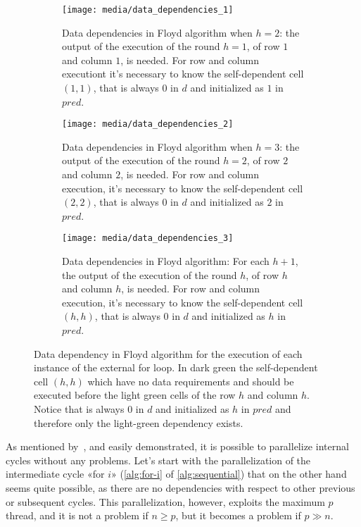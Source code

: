 \begin{figure}[htbp]
    \centering
    \begin{subfigure}[t]{0.3\textwidth}
        \centering
        \texttt{[image: media/data\_dependencies\_1]}
        \caption{Data dependencies in Floyd algorithm when \(h=2\): the output of the execution of the round \(h=1\), of row \(1\) and column \(1\), is needed. For row and column executiont it's necessary to know the self-dependent cell \((1,1)\), that is always \(0\) in \(d\) and initialized as \(1\) in \(pred\).}
        \label{fig:data-dependencies-1}
    \end{subfigure}
    \hfill
    \begin{subfigure}[t]{0.3\textwidth}
        \centering
        \texttt{[image: media/data\_dependencies\_2]}
        \caption{Data dependencies in Floyd algorithm when \(h=3\): the output of the execution of the round \(h=2\), of row \(2\) and column \(2\), is needed. For row and column execution, it's necessary to know the self-dependent cell \((2,2)\), that is always \(0\) in \(d\) and initialized as \(2\) in \(pred\).}
        \label{fig:data-dependencies-2}
    \end{subfigure}
    \hfill
    \begin{subfigure}[t]{0.3\textwidth}
        \centering
        \texttt{[image: media/data\_dependencies\_3]}
        \caption{Data dependencies in Floyd algorithm: For each \(h+1\), the output of the execution of the round \(h\), of row \(h\) and column \(h\), is needed. For row and column execution, it's necessary to know the self-dependent cell \((h,h)\), that is always \(0\) in \(d\) and initialized as \(h\) in \(pred\).}
        \label{fig:data-dependencies-3}
    \end{subfigure}
    \caption{Data dependency in Floyd algorithm for the execution of each instance of the external for loop. In dark green the self-dependent cell \((h,h)\) which have no data requirements and should be executed before the light green cells of the row \(h\) and column \(h\). Notice that is always \(0\) in \(d\) and initialized as \(h\) in \(pred\) and therefore only the light-green dependency exists.}
    \label{fig:data-dependency-external-loop}
\end{figure}

As mentioned by~\cite{rucci}, and easily demonstrated, it is possible to parallelize internal cycles without any problems. 
Let's start with the parallelization of  the intermediate cycle «for \(i\)» (\cref{alg:for-i} of \cref{alg:sequential}) that on the other hand seems quite possible, as there are no dependencies with respect to other previous or subsequent cycles.
This parallelization, however, exploits the maximum \(p\) thread, and it is not a problem if \(n \geq p\), but it becomes a problem if \(p \gg n\).

